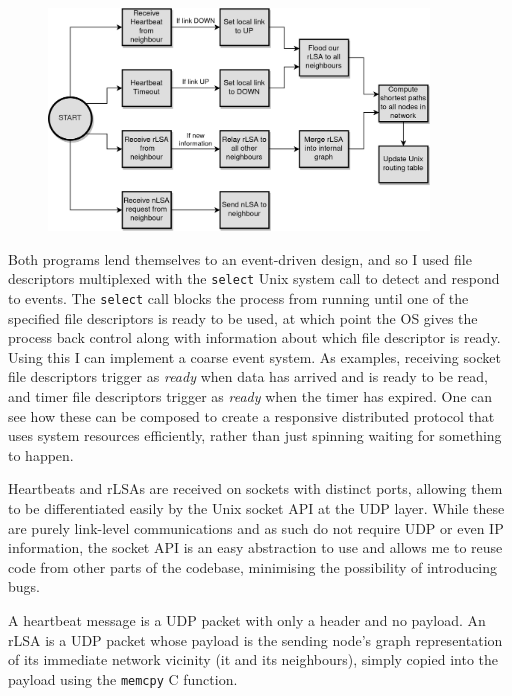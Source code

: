 \documentclass[withindex,glossary,openany]{cam-thesis}
\begin{document}
\begin{figure} \centering
	\includegraphics[width=0.9\textwidth]{flowchart_lsr}
	\label{fig:flowchart_lsr}
\end{figure}

Both programs lend themselves to an event-driven design, and so I used file descriptors multiplexed with the \texttt{select} Unix system call to detect and respond to events. The \texttt{select} call blocks the process from running until one of the specified file descriptors is ready to be used, at which point the OS gives the process back control along with information about which file descriptor is ready. Using this I can implement a coarse event system. As examples, receiving socket file descriptors trigger as \textit{ready} when data has arrived and is ready to be read, and timer file descriptors trigger as \textit{ready} when the timer has expired. One can see how these can be composed to create a responsive distributed protocol that uses system resources efficiently, rather than just spinning waiting for something to happen.

Heartbeats and rLSAs are received on sockets with distinct ports, allowing them to be differentiated easily by the Unix socket API at the UDP layer. While these are purely link-level communications and as such do not require UDP or even IP information, the socket API is an easy abstraction to use and allows me to reuse code from other parts of the codebase, minimising the possibility of introducing bugs.

A heartbeat message is a UDP packet with only a header and no payload. An rLSA is a UDP packet whose payload is the sending node's graph representation of its immediate network vicinity (it and its neighbours), simply copied into the payload using the \texttt{memcpy} C function.
\end{document}
